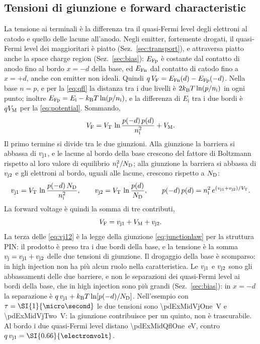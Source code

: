 \documentclass[10pt,a4paper]{scrartcl}
\let\newcommand\pdvaluedefine
\newcommand{\VF}{V_\mathrm{F}}
\newcommand{\vj}{v_\mathrm{j}}
\newcommand{\vjo}{v_\mathrm{j1}}
\newcommand{\vjt}{v_\mathrm{j2}}
\newcommand{\VT}{V_\mathrm{T}}
\newcommand{\ND}{N_\mathrm{D}}
\newcommand{\nint}{n_\mathrm{i}}
\newcommand{\VM}{V_\mathrm{M}}
\newcommand{\kB}{k_\mathrm{B}}
\newcommand{\EFn}{E_\mathrm{Fn}}
\newcommand{\EFp}{E_\mathrm{Fp}}
\newcommand{\Pp}{p\textsuperscript{+}}
\newcommand{\Nm}{n\textsuperscript{--}}
\newcommand{\Np}{n\textsuperscript{+}}
\begin{document}
\subsection{Tensioni di giunzione e forward characteristic}
\label{sec:vf}
La tensione ai terminali è la differenza tra il quasi-Fermi level degli elettroni al catodo e quello delle lacune all'anodo. Negli emitter, fortemente drogati, il quasi-Fermi level dei maggioritari è piatto (Sez.~\ref{sec:transport}), e attraversa piatto anche la space charge region (Sez.~\ref{sec:bias}): $\EFp$ è costante dal contatto di anodo fino al bordo $x = -d$ della base, ed $\EFn$ dal contatto di catodo fino a $x = +d$, anche con emitter non ideali. Quindi $q\,\VF = \EFn(d) - \EFp(-d)$. Nella base $n = p$, e per la \eqref{eq:qfl} la distanza tra i due livelli è $2\kB T\ln(p/\nint)$ in ogni punto; inoltre $\EFp = E_\mathrm{i} - \kB T\ln(p/\nint)$, e la differenza di $E_\mathrm{i}$ tra i due bordi è $q\VM$ per la \eqref{eq:potential}. Sommando,
\begin{equation}
\VF = \VT\,\ln\frac{p(-d)\,p(d)}{\nint^2} + \VM .
\label{eq:vfqfl}
\end{equation}
Il primo termine si divide tra le due giunzioni. Alla giunzione \Pp\Nm{} la barriera si abbassa di $\vjo$, e le lacune al bordo della base crescono del fattore di Boltzmann rispetto al loro valore di equilibrio $\nint^2/\ND$; alla giunzione \Nm\Np{} la barriera si abbassa di $\vjt$ e gli elettroni al bordo, uguali alle lacune, crescono rispetto a $\ND$:
\begin{equation}
\vjo = \VT\,\ln\frac{p(-d)\,\ND}{\nint^2} , \qquad \vjt = \VT\,\ln\frac{p(d)}{\ND} , \qquad
p(-d)\,p(d) = \nint^2\,e^{(\vjo+\vjt)/\VT} .
\label{eq:vj12}
\end{equation}
La forward voltage è quindi la somma di tre contributi,
\begin{equation}
\VF = \vjo + \VM + \vjt .
\label{eq:vfsum}
\end{equation}
La terza delle \eqref{eq:vj12} è la legge della giunzione \eqref{eq:junctionlaw} per la struttura PIN: il prodotto è preso tra i due bordi della base, e la tensione è la somma $\vj = \vjo + \vjt$ delle due tensioni di giunzione. Il drogaggio della base è scomparso: in high injection non ha più alcun ruolo nella caratteristica. Le $\vjo$ e $\vjt$ sono gli abbassamenti delle due barriere, e non le separazioni dei quasi-Fermi level ai bordi della base, che in high injection sono più grandi (Sez.~\ref{sec:bias}): in $x = -d$ la separazione è $q\,\vjo + \kB T\ln[p(-d)/\ND]$. Nell'esempio con $\tau = \SI{\pdExMidTau}{\micro\second}$ le due tensioni sono \SI{\pdExMidVjOne}{\volt} e \SI{\pdExMidVjTwo}{\volt}: la giunzione \Nm\Np{} contribuisce per un quinto, non è trascurabile. Al bordo \Pp{} i due quasi-Fermi level distano \SI{\pdExMidQflOne}{\electronvolt}, contro $q\,\vjo = \SI{\pdExMidVjOne}{\electronvolt}$.
\end{document}
